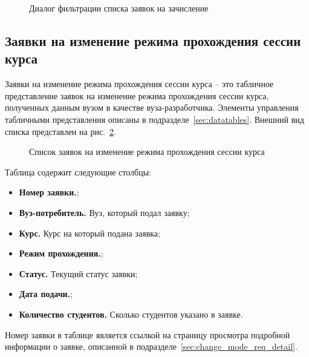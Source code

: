 \begin{figure}[H]
	\caption{Диалог фильтрации списка заявок на зачисление}
	\label{img:agreement:enroll_req_list_filter}
\end{figure}

\subsection{Заявки на изменение режима прохождения сессии курса}

Заявки на изменение режима прохождения сессии курса -- это табличное представление заявок на изменение 
режима прохождения сессии курса, полученных данным вузом в качестве вуза-разработчика. 
Элементы управления табличными представления описаны в подразделе~\ref{sec:datatables}.
Внешний вид списка представлен на рис.~\ref{img:agreement:change_mode_req_list}. 

\begin{figure}[H]
	\caption{Список заявок на изменение режима прохождения сессии курса}
	\label{img:agreement:change_mode_req_list}
\end{figure}

Таблица содержит следующие столбцы:
\begin{itemize}
	\item \textbf{Номер заявки.};
	\item \textbf{Вуз-потребитель.} Вуз, который подал заявку;
	\item \textbf{Курс.} Курс на который подана заявка;
	\item \textbf{Режим прохождения.};
	\item \textbf{Статус.} Текущий статус заявки;
	\item \textbf{Дата подачи.};
	\item \textbf{Количество студентов.} Сколько студентов указано в заявке.
\end{itemize}

Номер заявки в таблице является ссылкой на страницу просмотра подробной информации о заявке, 
описанной в подразделе~\ref{sec:change_mode_req_detail}.

